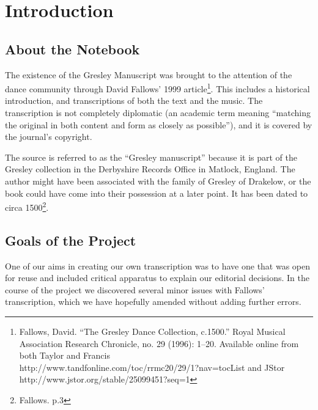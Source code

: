 \documentclass[12pt,letter]{article} %
\begin{document}
    \title{\rmfamily\normalfont{}}
    \author{}
    \date{} %
    
    \maketitle
    
    \tableofcontents
\newpage
\section{Introduction}
\subsection{About the Notebook}
The existence of the Gresley Manuscript was brought to the attention of the dance community through David Fallows’ 1999 article\footnote{Fallows, David. “The Gresley Dance Collection, c.1500.” Royal Musical Association Research Chronicle, no. 29 (1996): 1–20. Available online from both Taylor and Francis\\  http://www.tandfonline.com/toc/rrmc20/29/1?nav=tocList and JStor http://www.jstor.org/stable/25099451?seq=1}.  This includes a historical introduction, and transcriptions of both the text and the music.  The transcription is not completely diplomatic (an academic term meaning “matching the original in both content and form as closely as possible”), and it is covered by the journal’s copyright.

The source is referred to as the “Gresley manuscript” because it is part of the Gresley collection in the Derbyshire Records Office in Matlock, England. The author might have been associated with the family of Gresley of Drakelow, or the book could have come into their possession at a later point.  It has been dated to circa 1500\footnote{Fallows. p.3}.
\subsection{Goals of the Project}
One of our aims in creating our own transcription was to have one that was open for reuse and included critical apparatus to explain our editorial decisions.  In the course of the project we discovered several minor issues with Fallows’ transcription, which we have hopefully amended without adding further errors.
\end{document}
